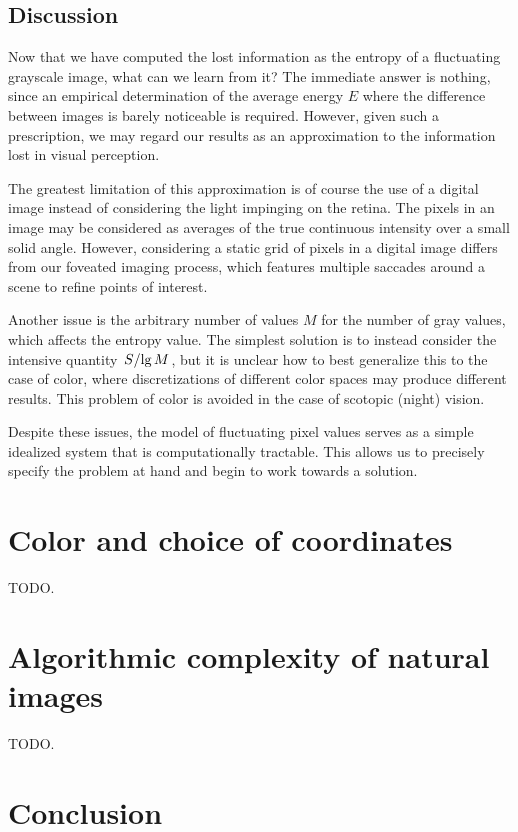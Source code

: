 \documentclass[aps,reprint,floatfix]{revtex4-2}
\renewcommand\mathrm\textnormal%
\theoremstyle{plain}
\theoremstyle{definition}
\renewcommand\lg{\operatorname{\mathrm{lg}}}
\begin{document}
\subsection{Discussion}\label{sec:wl-discussion}

Now that we have computed the lost information as the entropy of a fluctuating
grayscale image, what can we learn from it? The immediate answer is nothing,
since an empirical determination of the average energy $E$ where the difference
between images is barely noticeable is required. However, given such a
prescription, we may regard our results as an approximation to the information
lost in visual perception.

The greatest limitation of this approximation is of course the use of a digital
image instead of considering the light impinging on the retina. The pixels in an
image may be considered as averages of the true continuous intensity over a
small solid angle. However, considering a static grid of pixels in a digital
image differs from our foveated imaging process, which features multiple
saccades around a scene to refine points of interest.

Another issue is the arbitrary number of values $M$ for the number of gray
values, which affects the entropy value. The simplest solution is to instead
consider the intensive quantity $\flatfrac{S}{\lg M}$, but it is unclear how to
best generalize this to the case of color, where discretizations of different
color spaces may produce different results. This problem of color is avoided in
the case of scotopic (night) vision.

Despite these issues, the model of fluctuating pixel values serves as a simple
idealized system that is computationally tractable. This allows us to precisely
specify the problem at hand and begin to work towards a solution.

\section{Color and choice of coordinates}\label{sec:color}

TODO.

\section{Algorithmic complexity of natural images}\label{sec:graphics}

TODO.

\section{Conclusion}
\end{document}
